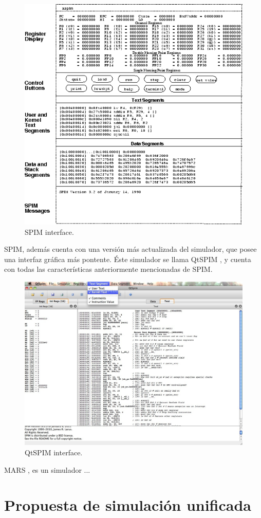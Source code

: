 \begin{figure}[htbp]
 	\centering
 	\includegraphics[width=12cm]{figures/spim_figure}
 	\caption{SPIM interface.}
	\label{fig:spim_figure}
\end{figure}

SPIM, además cuenta con una versión más actualizada del simulador, que posee una interfaz gráfica más pontente. Éste simulador se llama QtSPIM \cite{aguilar2013simuladores}, y cuenta con todas las características anteriormente mencionadas de SPIM.

\begin{figure}[htbp]
 	\centering
 	\includegraphics[width=12cm]{figures/qtspim_figure}
 	\caption{QtSPIM interface.}
	\label{fig:qtspim_figure}
\end{figure}

MARS \cite{vollmar2006mars}, es un simulador ... 

\section{Propuesta de simulación unificada}
\label{sec:propuesta_simulacion}

